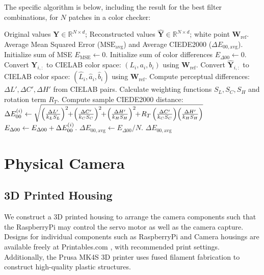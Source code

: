 The specific algorithm is below, including the result for the best  filter combinations, for $N$ patches in a color checker:

\begingroup
\setlength{\textfloatsep}{6pt}
\setlength{\floatsep}{6pt}
\setlength{\intextsep}{6pt}
\begin{algorithm}[H]
\caption{Evaluation Pipeline: $\dE$ Computation}
\label{alg:mse-de00-eval}
\begin{algorithmic}[1]
\Require Original values $\mathbf{Y}\in\mathbb{R}^{N\times d}$; Reconstructed values $\widehat{\mathbf{Y}}\in\mathbb{R}^{N\times d}$; white point $\mathbf{W}_{\text{ref}}$.
\Ensure Average Mean Squared Error ($\text{MSE}_{\text{avg}}$) and Average CIEDE2000 ($\Delta E_{00,\text{avg}}$).
\State Initialize sum of MSE $E_{\text{MSE}} \leftarrow 0$.
\State Initialize sum of color differences $E_{\Delta00} \leftarrow 0$.
    \State Convert $\mathbf{Y}_{i,:}$ to CIELAB color space: $(L_i, a_i, b_i)$ using $\mathbf{W}_{\text{ref}}$.
    \State Convert $\widehat{\mathbf{Y}}_{i,:}$ to CIELAB color space: $(\widehat{L}_i, \widehat{a}_i, \widehat{b}_i)$ using $\mathbf{W}_{\text{ref}}$.
    \State Compute perceptual differences: $\Delta L', \Delta C', \Delta H'$ from CIELAB pairs.
    \State Calculate weighting functions $S_L, S_C, S_H$ and rotation term $R_T$.
    \State Compute sample CIEDE2000 distance:
    \Statex \qquad $\dE^{(i)} \leftarrow \sqrt{ \left( \frac{\Delta L'}{k_L S_L} \right)^2 \!\!+\! \left( \frac{\Delta C'}{k_C S_C} \right)^2 \!\!+\! \left( \frac{\Delta H'}{k_H S_H} \right)^2 \!\!+\! R_T \left( \frac{\Delta C'}{k_C S_C} \right) \!\left( \frac{\Delta H'}{k_H S_H} \right) }$
    \State $E_{\Delta00} \leftarrow E_{\Delta00} + \Delta E_{00}^{(i)}$.
\EndFor
\State $\Delta E_{00,\text{avg}} \leftarrow E_{\Delta00} / N$.
\State \Return $\Delta E_{00,\text{avg}}$
\end{algorithmic}
\end{algorithm}
\endgroup

\section{Physical Camera}

\subsection{3D Printed Housing}

We construct a 3D printed housing to arrange the camera components such that the RaspberryPi may control the servo motor as well as the camera capture.
Designs for individual components such as RaspberryPi and Camera housings are available freely at Printables.com \cite{Thompson2022, Stamos2024, Baxcor2022}, with recommended print settings. 
Additionally, the Prusa MK4S 3D printer \cite{PrusaMK4S, Kopovaetal2024, Zeidanetal2024} uses fused filament fabrication to construct high-quality plastic structures. 

